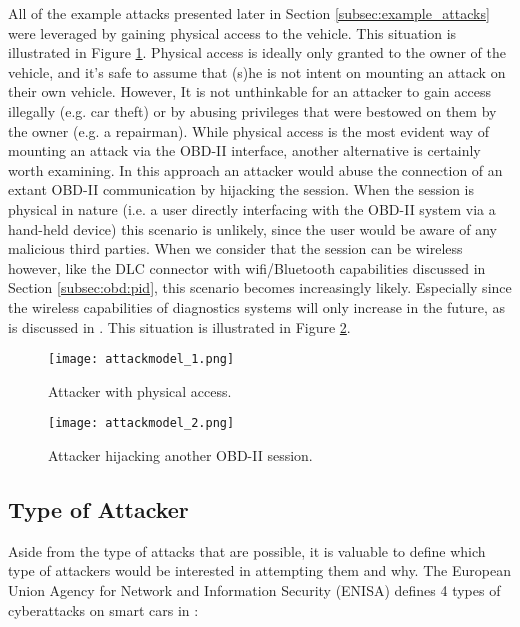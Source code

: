 All of the example attacks presented later in Section \ref{subsec:example_attacks} were leveraged by gaining physical access to the vehicle. This situation is illustrated in Figure \ref{fig:attackmodel_1}. Physical access is ideally only granted to the owner of the vehicle, and it's safe to assume that (s)he is not intent on mounting an attack on their own vehicle. However, It is not unthinkable for an attacker to gain access illegally (e.g. car theft) or by abusing privileges that were bestowed on them by the owner (e.g. a repairman). While physical access is the most evident way of mounting an attack via the OBD-II interface, another alternative is certainly worth examining. In this approach an attacker would abuse the connection of an extant OBD-II communication by hijacking the session. When the session is physical in nature (i.e. a user directly interfacing with the OBD-II system via a hand-held device) this scenario is unlikely, since the user would be aware of any malicious third parties. When we consider that the session can be wireless however, like the DLC connector with wifi/Bluetooth capabilities discussed in Section \ref{subsec:obd:pid}, this scenario becomes increasingly likely. Especially since the wireless capabilities of diagnostics systems will only increase in the future, as is discussed in \cite{Kleberger}. This situation is illustrated in Figure \ref{fig:attackmodel_2}.


\begin{figure}[h]
	\label{fig:attackmodel_1}
	\centering
	\texttt{[image: attackmodel\_1.png]}
	\caption{Attacker with physical access.}
\end{figure}

\begin{figure}[h]
	\label{fig:attackmodel_2}
	\centering
	\texttt{[image: attackmodel\_2.png]}
	\caption{Attacker hijacking another OBD-II session.}
\end{figure}

\subsection{Type of Attacker}
\label{subsec:attacker_type}

Aside from the type of attacks that are possible, it is valuable to define which type of attackers would be interested in attempting them and why. The European Union Agency for Network and Information Security (ENISA) defines 4 types of cyberattacks on smart cars in \cite{Enisa}: 

